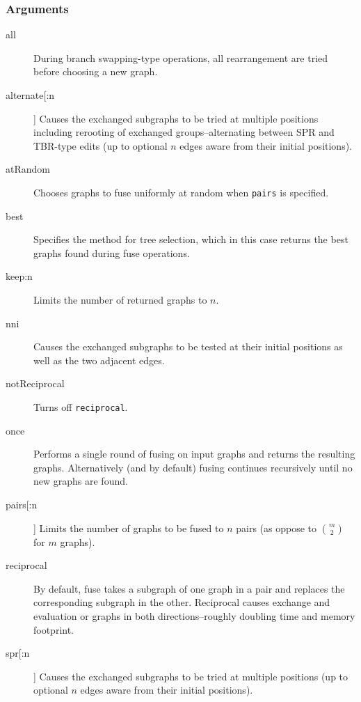 	\subsubsection{Arguments}
	\begin{description}
		\item [all]  During branch swapping-type operations, all rearrangement are tried before choosing a new graph. 
		
		\item [alternate[:n]] Causes the exchanged subgraphs to be tried at multiple positions including rerooting of 
		exchanged groups--alternating between SPR and TBR-type edits (up to optional 
		$n$ edges aware from their initial positions).
		
		\item [atRandom] Chooses graphs to fuse uniformly at random when \texttt{pairs} is specified. 
		
		\item [best] Specifies the method for tree selection, which in this case returns the best graphs 
		found during fuse operations.		
		
		\item [keep:n] Limits the number of returned graphs to $n$. 
		
		\item [nni] Causes the exchanged subgraphs to be tested at their initial positions as well as the 
		two adjacent edges.
		
		\item [notReciprocal] Turns off \texttt{reciprocal}.
		
		\item [once] Performs a single round of fusing on input graphs and returns the resulting graphs. 
		Alternatively (and by default) fusing continues recursively until no new graphs are found.
		
		\item [pairs[:n]] Limits the number of graphs to be fused to $n$ pairs (as oppose to $\binom{m}{2}$ for $m$ graphs).
		
		\item [reciprocal] By default, fuse takes a subgraph of one graph in a pair and replaces the corresponding subgraph 
		in the other.  Reciprocal causes exchange and evaluation or graphs in both directions--roughly doubling time and 
		memory footprint.
		
		\item [spr[:n]] Causes the exchanged subgraphs to be tried at multiple positions (up to optional 
		$n$ edges aware from their initial positions).
		

\end{description}
